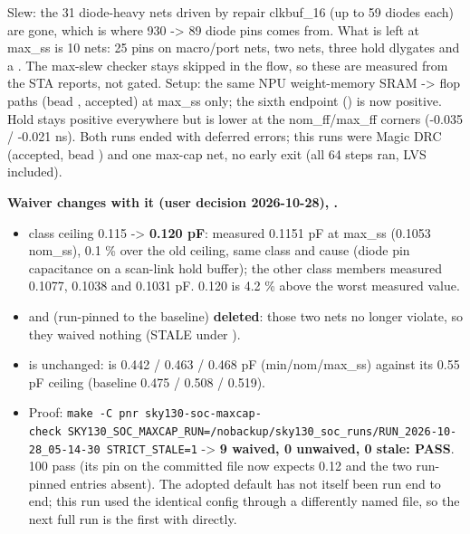 \begin{record}
{}

Slew: the 31 diode-heavy nets driven by  repair clkbuf\_16
(up to 59 diodes each) are gone, which is where 930 -\textgreater{} 89
diode pins comes from. What is left at max\_ss is 10 nets: 25 pins on
macro/\allowbreak{}port nets, two  nets, three hold
dlygates and a . The max-slew checker stays skipped in the
flow, so these are measured from the STA reports, not gated. Setup: the
same NPU weight-memory SRAM -\textgreater{}  flop
paths (bead , accepted) at max\_ss only; the sixth endpoint
() is now positive. Hold stays positive everywhere but is
lower at the nom\_\allowbreak{}ff/\allowbreak{}max\_\allowbreak{}ff
corners (-0.035 / -0.021 ns). Both runs ended  with deferred
errors; this run\textquotesingle s were Magic DRC (accepted, bead
) and one max-cap net, no early exit (all 64 steps ran, LVS
included).

\textbf{Waiver changes with it (user decision 2026-10-28),
.}

\begin{itemize}
\tightlist
\item
   class ceiling 0.115 -\textgreater{}
  \textbf{0.120 pF}:  measured 0.1151 pF at max\_ss
  (0.1053 nom\_ss), 0.1 \% over the old ceiling, same class and cause
  (diode pin capacitance on a scan-link hold buffer); the other class
  members measured 0.1077, 0.1038 and 0.1031 pF. 0.120 is 4.2 \% above
  the worst measured value.
\item
   and
   (run-pinned to the baseline)
  \textbf{deleted}: those two nets no longer violate, so they waived
  nothing (STALE under ).
\item
   is unchanged:  is
  0.442 / 0.463 / 0.468 pF
  (min/\allowbreak{}nom/\allowbreak{}max\_\allowbreak{}ss) against its
  0.55 pF ceiling (baseline 0.475 / 0.508 / 0.519).
\item
  Proof:
  \texttt{make\ -\allowbreak{}C\ pnr\ sky130-\allowbreak{}soc-\allowbreak{}maxcap-\allowbreak{}check\ SKY130\_\allowbreak{}SOC\_\allowbreak{}MAXCAP\_\allowbreak{}RUN=\allowbreak{}/\allowbreak{}nobackup/\allowbreak{}sky130\_\allowbreak{}soc\_\allowbreak{}runs/\allowbreak{}RUN\_\allowbreak{}2026-\allowbreak{}10-\allowbreak{}28\_\allowbreak{}05-\allowbreak{}14-\allowbreak{}30\ STRICT\_\allowbreak{}STALE=\allowbreak{}1}
  -\textgreater{} \textbf{9 waived, 0 unwaived, 0 stale: PASS}.
   100 pass (its pin on the
  committed file now expects 0.12 and the two run-pinned entries
  absent). The adopted default has not itself been run end to end; this
  run used the identical config through a differently named file, so the
  next full run is the first with  directly.
\end{itemize}


\end{record}

